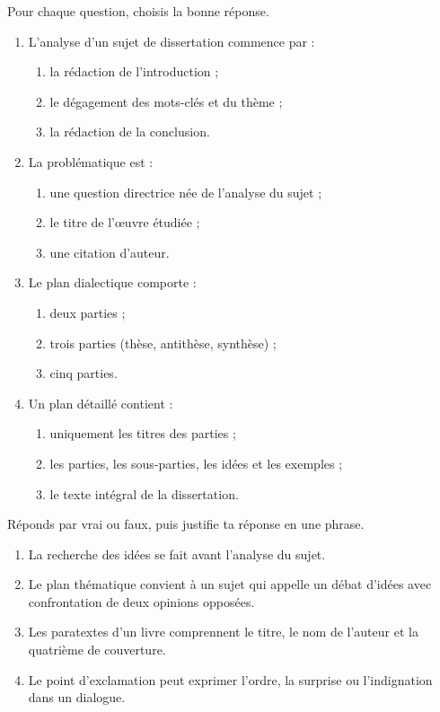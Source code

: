 \documentclass[11pt]{article}
\begin{document}
\begin{exercice}
Pour chaque question, choisis la bonne réponse.
\begin{enumerate}
\item L'analyse d'un sujet de dissertation commence par :
\begin{enumerate}
\item la rédaction de l'introduction ;
\item le dégagement des mots-clés et du thème ;
\item la rédaction de la conclusion.
\end{enumerate}
\item La problématique est :
\begin{enumerate}
\item une question directrice née de l'analyse du sujet ;
\item le titre de l'œuvre étudiée ;
\item une citation d'auteur.
\end{enumerate}
\item Le plan dialectique comporte :
\begin{enumerate}
\item deux parties ;
\item trois parties (thèse, antithèse, synthèse) ;
\item cinq parties.
\end{enumerate}
\item Un plan détaillé contient :
\begin{enumerate}
\item uniquement les titres des parties ;
\item les parties, les sous-parties, les idées et les exemples ;
\item le texte intégral de la dissertation.
\end{enumerate}
\end{enumerate}
\end{exercice}

\begin{exercice}
Réponds par vrai ou faux, puis justifie ta réponse en une phrase.
\begin{enumerate}
\item La recherche des idées se fait avant l'analyse du sujet.
\item Le plan thématique convient à un sujet qui appelle un débat d'idées avec confrontation de deux opinions opposées.
\item Les paratextes d'un livre comprennent le titre, le nom de l'auteur et la quatrième de couverture.
\item Le point d'exclamation peut exprimer l'ordre, la surprise ou l'indignation dans un dialogue.
\end{enumerate}
\end{exercice}
\end{document}
